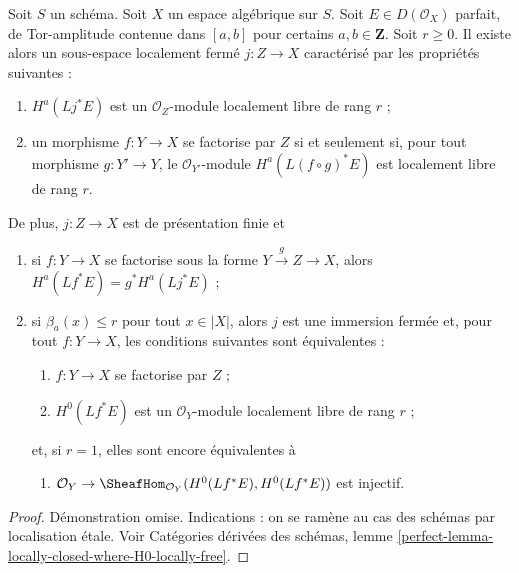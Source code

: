 \begin{lemma}
\label{lemma-locally-closed-where-H0-locally-free}
Soit $S$ un sch\'ema. Soit $X$ un espace alg\'ebrique sur $S$.
Soit $E\in D(\mathcal{O}_X)$ parfait, de Tor-amplitude contenue dans
$[a,b]$ pour certains $a,b\in\mathbf{Z}$.
Soit $r\geq0$.
Il existe alors un sous-espace localement ferm\'e $j:Z\to X$ caract\'eris\'e
par les propri\'et\'es suivantes :
\begin{enumerate}
\item $H^a(Lj^*E)$ est un $\mathcal{O}_Z$-module localement libre de rang $r$ ;
\item un morphisme $f:Y\to X$ se factorise par $Z$ si et seulement si, pour
tout morphisme $g:Y'\to Y$, le $\mathcal{O}_{Y'}$-module
$H^a(L(f\circ g)^*E)$ est localement libre de rang $r$.
\end{enumerate}
De plus, $j:Z\to X$ est de pr\'esentation finie et
\begin{enumerate}
\item[(3)] si $f:Y\to X$ se factorise sous la forme
$Y\xrightarrow{g}Z\to X$, alors
$H^a(Lf^*E)=g^*H^a(Lj^*E)$ ;
\item[(4)] si $\beta_a(x)\leq r$ pour tout $x\in|X|$, alors $j$ est une
immersion ferm\'ee et, pour tout $f:Y\to X$, les conditions suivantes sont
\'equivalentes :
\begin{enumerate}
\item $f:Y\to X$ se factorise par $Z$ ;
\item $H^0(Lf^*E)$ est un $\mathcal{O}_Y$-module localement libre de rang $r$ ;
\end{enumerate}
et, si $r=1$, elles sont encore \'equivalentes \`a
\begin{enumerate}
\item[(c)] $\mathcal{O}_Y\to
\SheafHom_{\mathcal{O}_Y}(H^0(Lf^*E),H^0(Lf^*E))$ est injectif.
\end{enumerate}
\end{enumerate}
\end{lemma}

\begin{proof}
D\'emonstration omise. Indications :
on se ram\`ene au cas des sch\'emas par localisation \'etale. Voir Cat\'egories
d\'eriv\'ees des sch\'emas, lemme
\ref{perfect-lemma-locally-closed-where-H0-locally-free}.
\end{proof}

